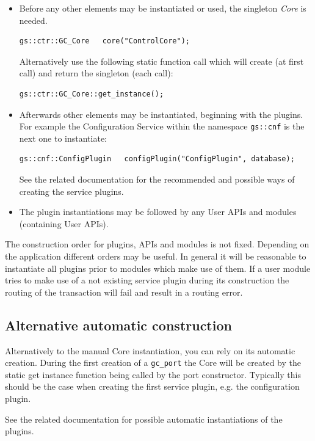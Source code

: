 \begin{itemize}

  \item Before any other \GreenControl elements may be instantiated or used, the singleton \emph{Core} is needed.
\begin{lstlisting}
gs::ctr::GC_Core   core("ControlCore");
\end{lstlisting}
Alternatively use the following static function call which will create (at first call) and return the singleton (each call):
\begin{lstlisting}
gs::ctr::GC_Core::get_instance();
\end{lstlisting}

  \item Afterwards other \GreenControl elements may be instantiated, beginning with the plugins. For example the Configuration Service within the namespace \lstinline|gs::cnf| is the next one to instantiate:
\begin{lstlisting}
gs::cnf::ConfigPlugin   configPlugin("ConfigPlugin", database);
\end{lstlisting}
See the related documentation for the recommended and possible ways of creating the service plugins.

  \item The plugin instantiations may be followed by any User APIs and modules (containing User APIs). 
\end{itemize}

The construction order for plugins, APIs and modules is not fixed. Depending on the application different orders may be useful. In general it will be reasonable to instantiate all plugins prior to modules which make use of them. If a user module tries to make use of a not existing service plugin during its construction the routing of the transaction will fail and result in a routing error.

\subsection{Alternative automatic construction}
Alternatively to the manual Core instantiation, you can rely on its automatic creation. During the first creation of a \lstinline|gc_port| the Core will be created by the static get instance function being called by the port constructor. Typically this should be the case when creating the first service plugin, e.g. the configuration plugin.

See the related documentation for possible automatic instantiations of the plugins.

